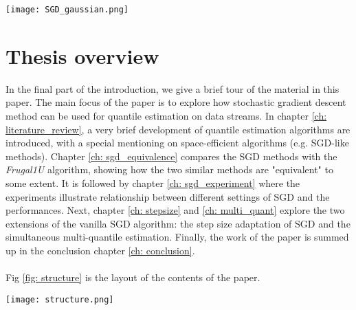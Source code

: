 \begin{figure*}[h!]
	\texttt{[image: SGD\_gaussian.png]}
    \caption{SGD quantile estimation of the $0.99$-q for a dataset of 2000 samples from a Gaussian distribution. The left graph is a combination of incoming data points and the SGD steps, and each step of SGD is triggered by a new coming data point. The blue line shows how the SGD result is updated on the arrival of a data point (sea-green), and straight line (violet) represents the empirical value of $0.99$-q. On the right side, the density of the bell-shaped dataset is shown in a histogram.}
    \label{fig: SGD_quant}
\end{figure*}

\section{Thesis overview}
\label{sec: intro_overview}
In the final part of the introduction, we give a brief tour of the material in this paper.
The main focus of the paper is to explore how stochastic gradient descent method can be used for quantile estimation on data streams.
In chapter \ref{ch: literature_review}, a very brief development of quantile estimation algorithms are introduced, with a special mentioning on space-efficient algorithms (e.g. SGD-like methods). 
Chapter \ref{ch: sgd_equivalence} compares the SGD methods with the \textit{Frugal1U} algorithm\cite{maFrugalStreamingEstimating2014}, showing how the two similar methods are "equivalent" to some extent.
It is followed by chapter \ref{ch: sgd_experiment} where the experiments illustrate relationship between different settings of SGD and the performances. 
Next, chapter \ref{ch: stepsize} and \ref{ch: multi_quant} explore the two extensions of the vanilla SGD algorithm: the step size adaptation of SGD and the simultaneous multi-quantile estimation. Finally, the work of the paper is summed up in the conclusion chapter \ref{ch: conclusion}.
\\\\
Fig \ref{fig: structure} is the layout of the contents of the paper.

\begin{figure*}[h!]
    \centering
	\texttt{[image: structure.png]}
    \caption{The relationship between topics covered in the thesis. Topics are roughly positioned along the top-bottom axis depending on where they are more close to SGD methods (left) or non-SGD methods (right). The arrows between the chapters represent are connected according to dependence.}
    \label{fig: structure}
\end{figure*}